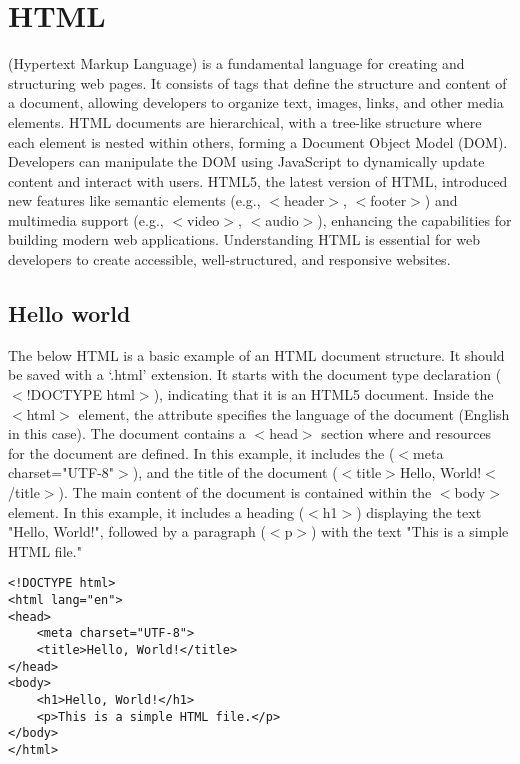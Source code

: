 \chapter{HTML}
\thispagestyle{fancy}
\lstset{language=html, style=htmlstyle}

 (Hypertext Markup Language) is a fundamental language for creating and structuring web pages. It consists of tags that define the structure and content of a document, allowing developers to organize text, images, links, and other media elements. HTML documents are hierarchical, with a tree-like structure where each element is nested within others, forming a Document Object Model (DOM). Developers can manipulate the DOM using JavaScript to dynamically update content and interact with users. HTML5, the latest version of HTML, introduced new features like semantic elements (e.g., $<$header$>$, $<$footer$>$) and multimedia support (e.g., $<$video$>$, $<$audio$>$), enhancing the capabilities for building modern web applications. Understanding HTML is essential for web developers to create accessible, well-structured, and responsive websites.

\section{Hello world}

The below HTML is a basic example of an HTML document structure. It should be saved with a `.html' extension. It starts with the document type declaration ($<$!DOCTYPE html$>$), indicating that it is an HTML5 document. Inside the $<$html$>$ element, the  attribute specifies the language of the document (English in this case). The document contains a $<$head$>$ section where  and resources for the document are defined. In this example, it includes the  ($<$meta charset="UTF-8"$>$), and the title of the document ($<$title$>$Hello, World!$<$/title$>$). The main content of the document is contained within the $<$body$>$ element. In this example, it includes a heading ($<$h1$>$) displaying the text "Hello, World!", followed by a paragraph ($<$p$>$) with the text "This is a simple HTML file."

\begin{lstlisting}
<!DOCTYPE html>
<html lang="en">
<head>
    <meta charset="UTF-8">
    <title>Hello, World!</title>
</head>
<body>
    <h1>Hello, World!</h1>
    <p>This is a simple HTML file.</p>
</body>
</html>
\end{lstlisting}

